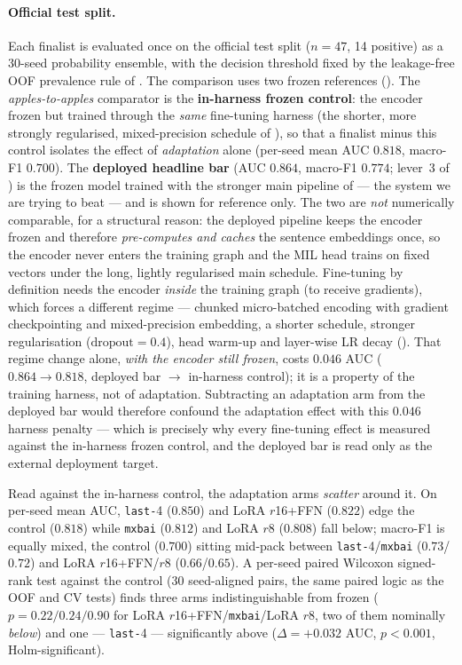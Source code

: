 \documentclass[conference]{IEEEtran}
\begin{document}
\paragraph{Official test split.} Each finalist is evaluated once on the official
test split ($n\!=\!47$, 14 positive) as a 30-seed probability ensemble, with the
decision threshold fixed by the leakage-free OOF prevalence rule of
. The comparison uses two frozen references
(). The \emph{apples-to-apples} comparator is the
\textbf{in-harness frozen control}: the encoder frozen but trained through the
\emph{same} fine-tuning harness (the shorter, more strongly regularised,
mixed-precision schedule of ), so that a finalist minus
this control isolates the effect of \emph{adaptation} alone (per-seed mean AUC
$0.818$, macro-F1 $0.700$). The \textbf{deployed headline bar} (AUC $0.864$, macro-F1 $0.774$;
lever~3 of ) is the frozen model trained with the stronger main
pipeline of  --- the system we are trying to beat --- and is
shown for reference only. The two are \emph{not} numerically comparable, for a
structural reason: the deployed pipeline keeps the encoder frozen and therefore
\emph{pre-computes and caches} the sentence embeddings once, so the encoder never
enters the training graph and the MIL head trains on fixed vectors under the long,
lightly regularised main schedule. Fine-tuning by definition needs the encoder
\emph{inside} the training graph (to receive gradients), which forces a different
regime --- chunked micro-batched encoding with gradient checkpointing and
mixed-precision embedding, a shorter schedule, stronger regularisation
($\text{dropout}=0.4$), head warm-up and layer-wise LR decay ().
That regime change alone, \emph{with the encoder still frozen}, costs $0.046$ AUC
($0.864\!\to\!0.818$, deployed bar $\to$ in-harness control); it is a property of
the training harness, not of adaptation. Subtracting an adaptation arm from the
deployed bar would therefore confound the adaptation effect with this $0.046$
harness penalty --- which is precisely why every fine-tuning effect is measured
against the in-harness frozen control, and the deployed bar is read only as the
external deployment target.

Read against the in-harness control, the adaptation arms \emph{scatter} around it.
On per-seed mean AUC, \texttt{last-}4 ($0.850$) and LoRA $r$16+FFN ($0.822$) edge
the control ($0.818$) while \texttt{mxbai} ($0.812$) and LoRA $r$8 ($0.808$) fall
below; macro-F1 is equally mixed, the control ($0.700$) sitting mid-pack between
\texttt{last-}4/\texttt{mxbai} ($0.73$/$0.72$) and LoRA $r$16+FFN/$r$8
($0.66$/$0.65$). A per-seed paired Wilcoxon signed-rank test against the control
(30 seed-aligned pairs, the same paired logic as the OOF and CV tests) finds three
arms indistinguishable from frozen ($p=0.22/0.24/0.90$ for LoRA
$r$16+FFN/\texttt{mxbai}/LoRA $r$8, two of them nominally \emph{below}) and one ---
\texttt{last-}4 --- significantly above ($\Delta=+0.032$ AUC, $p<0.001$,
Holm-significant).
\end{document}
